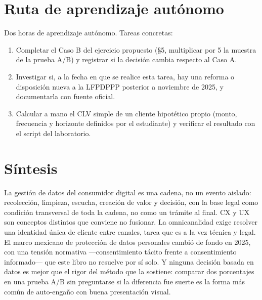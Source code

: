 \section{Ruta de aprendizaje autónomo}

Dos horas de aprendizaje autónomo. Tareas concretas:
\begin{enumerate}
  \item Completar el Caso B del ejercicio propuesto (§5, multiplicar por 5
  la muestra de la prueba A/B) y registrar si la decisión cambia respecto al
  Caso A.
  \item Investigar si, a la fecha en que se realice esta tarea, hay una
  reforma o disposición nueva a la LFPDPPP posterior a noviembre de 2025, y
  documentarla con fuente oficial.
  \item Calcular a mano el CLV simple de un cliente hipotético propio
  (monto, frecuencia y horizonte definidos por el estudiante) y verificar el
  resultado con el script del laboratorio.
\end{enumerate}

\section{Síntesis}

La gestión de datos del consumidor digital es una cadena, no un evento
aislado: recolección, limpieza, escucha, creación de valor y decisión, con
la base legal como condición transversal de toda la cadena, no como un
trámite al final. CX y UX son conceptos distintos que conviene no fusionar.
La omnicanalidad exige resolver una identidad única de cliente entre
canales, tarea que es a la vez técnica y legal. El marco mexicano de
protección de datos personales cambió de fondo en 2025, con una tensión
normativa —consentimiento tácito frente a consentimiento informado— que este
libro no resuelve por sí solo. Y ninguna decisión basada en datos es mejor
que el rigor del método que la sostiene: comparar dos porcentajes en una prueba A/B sin preguntarse si la diferencia
fue suerte es la forma más común de auto-engaño con buena presentación visual.

